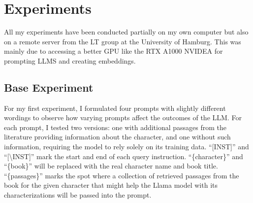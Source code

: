 \chapter{Experiments}

All my experiments have been conducted partially on my own computer but also on a remote server from the LT group at the University of Hamburg. This was mainly due to accessing a better GPU like the RTX A1000 NVIDEA for prompting LLMS and creating embeddings.


\section{Base Experiment}

For my first experiment, I formulated four prompts with slightly different wordings to observe how varying prompts affect the outcomes of the LLM. For each prompt, I tested two versions: one with additional passages from the literature providing information about the character, and one without such information, requiring the model to rely solely on its training data. ``[INST]'' and ``[\textbackslash INST]'' mark the start and end of each query instruction. ``\{character\}'' and ``\{book\}'' will be replaced with the real character name and book title. ``\{passages\}'' marks the spot where a collection of retrieved passages from the book for the given character that might help the Llama model with its characterizations will be passed into the prompt.\\



